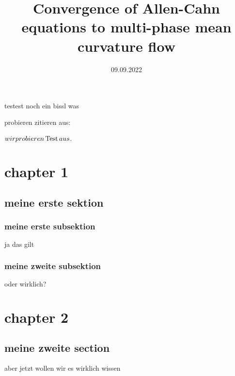 \documentclass[a4paper, 10pt, bibliogrpahy = totocnumbered]{scrbook}
\date{09.09.2022}
\title{Convergence of Allen-Cahn equations to multi-phase mean curvature flow}
\begin{document}
	
\frontmatter	

	\maketitle
	\tableofcontents
	
\mainmatter	
	testest noch ein bissl was
	
	probieren zitieren aus:
	\cite{convergence_of_allen_cahn_equation_to_multiphase_mean_curvature_flow}
	
	$ wir probieren \operatorname{Test} aus $.
	
	\ThisIsMyCommand
	
	
	
	\chapter{chapter 1}
	\section{meine erste sektion}
	
	\subsection{meine erste subsektion}
	\begin{theorem}
		ja das gilt
	\end{theorem}

	\subsection{meine zweite subsektion}
	
	\begin{lemma}
		oder wirklich?
	\end{lemma}
	
	\chapter{chapter 2}
	
	\section{meine zweite section}
	
	\begin{definition}
		aber jetzt wollen wir es wirklich wissen
	\end{definition}
\appendix

\backmatter

	\printbibliography
	
\end{document}
